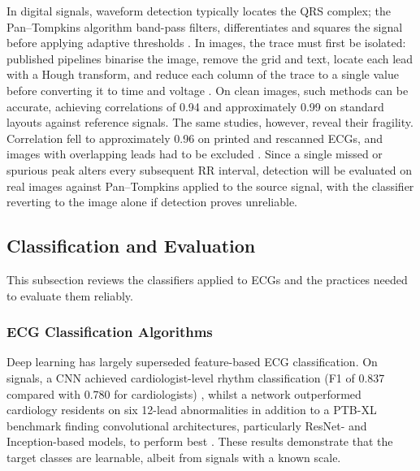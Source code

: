 \documentclass[12pt,nonacm,acmlarge,titlepage,screen]{acmart}
\begin{document}
In digital signals, waveform detection typically locates the QRS complex; the Pan--Tompkins algorithm band-pass filters, differentiates and squares the signal before applying adaptive thresholds \cite{pan_real-time_1985}. In images, the trace must first be isolated: published pipelines binarise the image, remove the grid and text, locate each lead with a Hough transform, and reduce each column of the trace to a single value before converting it to time and voltage \cite{wu_automated_2022}. On clean images, such methods can be accurate, achieving correlations of 0.94 \cite{randazzo_development_2022} and approximately 0.99 on standard layouts \cite{wu_automated_2022} against reference signals. The same studies, however, reveal their fragility. Correlation fell to approximately 0.96 on printed and rescanned ECGs, and images with overlapping leads had to be excluded \cite{wu_automated_2022}. Since a single missed or spurious peak alters every subsequent RR interval, detection will be evaluated on real images against Pan--Tompkins applied to the source signal, with the classifier reverting to the image alone if detection proves unreliable.

\subsection{Classification and Evaluation}
\label{sec:class-group}

This subsection reviews the classifiers applied to ECGs and the practices needed to evaluate them reliably.

\subsubsection{ECG Classification Algorithms}
\label{sec:ml-ecg}

Deep learning has largely superseded feature-based ECG classification. On signals, a CNN achieved cardiologist-level rhythm classification (F1 of 0.837 compared with 0.780 for cardiologists) \cite{hannun_cardiologist_2019}, whilst a network outperformed cardiology residents on six 12-lead abnormalities \cite{ribeiro_automatic_2020} in addition to a PTB-XL benchmark finding convolutional architectures, particularly ResNet- and Inception-based models, to perform best \cite{strodthoff_deep_2021}. These results demonstrate that the target classes are learnable, albeit from signals with a known scale.
\end{document}
